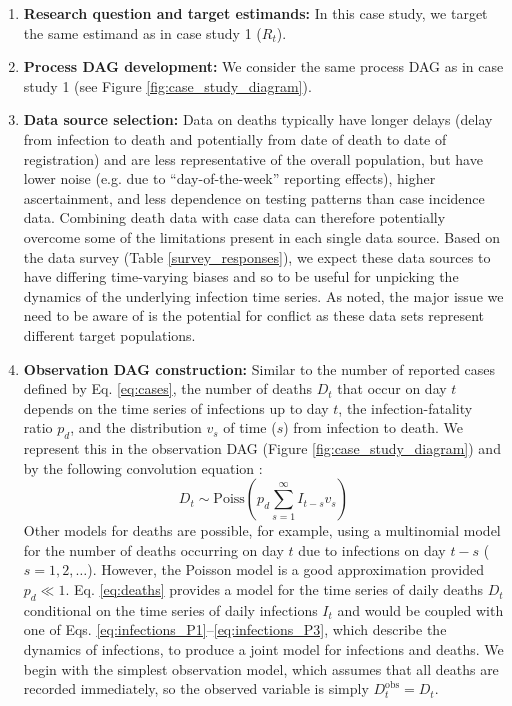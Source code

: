 \documentclass{article}
\begin{document}
\begin{enumerate}
   \item \textbf{Research question and target estimands:}  In this case study, we target the same estimand as in case study 1 ($R_t$). 
   
    \item \textbf{Process DAG development:} We consider the same process \ac{DAG} as in case study 1 (see Figure \ref{fig:case_study_diagram}).
        
    \item \textbf{Data source selection:} Data on deaths typically have longer delays (delay from infection to death and potentially from date of death to date of registration) and are less representative of the overall population, but have lower noise (e.g. due to ``day-of-the-week'' reporting effects), higher ascertainment, and less dependence on testing patterns than case incidence data. Combining death data with case data can therefore potentially overcome some of the limitations present in each single data source. Based on the data survey (Table \ref{survey_responses}), we expect these data sources to have differing time-varying biases and so to be useful for unpicking the dynamics of the underlying infection time series. As noted, the major issue we need to be aware of is the potential for conflict as these data sets represent different target populations.
    
    \item \textbf{Observation DAG construction:} Similar to the number of reported cases defined by Eq. \eqref{eq:cases}, the number of deaths $D_t$ that occur on day $t$ depends on the time series of infections up to day $t$, the infection-fatality ratio $p_d$, and the distribution $v_s$ of time ($s$) from infection to death. We represent this in the observation \ac{DAG} (Figure \ref{fig:case_study_diagram}) and by the following convolution equation \citep{bhatt2023semi}:
    \begin{equation} \label{eq:deaths}
        D_t \sim \mathrm{Poiss}\left(p_d \sum_{s=1}^\infty I_{t-s}v_s \right)
    \end{equation}
    Other models for deaths are possible, for example, using a multinomial model for the number of deaths occurring on day $t$ due to infections on day $t-s$ ($s=1,2,\ldots$). However, the Poisson model is a good approximation provided $p_d\ll 1$. 
    Eq. \eqref{eq:deaths} provides a model for the time series of daily deaths $D_t$ conditional on the time series of daily infections $I_t$ and would be coupled with one of Eqs. \eqref{eq:infections_P1}--\eqref{eq:infections_P3}, which describe the dynamics of infections, to produce a joint model for infections and deaths. We begin with the simplest observation model, which assumes that all deaths are recorded immediately, so the observed variable is simply $D^\mathrm{obs}_t=D_t$.
    



\end{enumerate}
\end{document}

